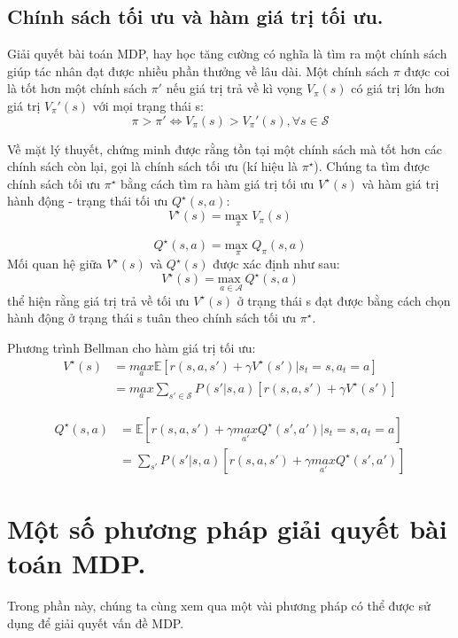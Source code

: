 \documentclass{uetgraduation}
\begin{document}
\subsection{Chính sách tối ưu và hàm giá trị tối ưu.}
Giải quyết bài toán MDP, hay học tăng cường có nghĩa là tìm ra một chính sách giúp tác nhân đạt được nhiều phần thưởng về lâu dài. Một chính sách $\pi$ được coi là tốt hơn một chính sách $\pi'$ nếu giá
trị trả về kì vọng $V_\pi(s)$ có giá trị lớn hơn giá trị $V_\pi'(s)$ với mọi trạng thái s:
\[
\pi > \pi' \iff V_\pi(s) > V_\pi'(s), \forall s \in \mathcal{S}
\]

Về mặt lý thuyết, chứng minh được rằng tồn tại một chính sách mà tốt hơn các chính sách còn lại, gọi là chính sách tối ưu (kí hiệu là $\pi^\star$). Chúng ta tìm được chính sách tối ưu $\pi^\star$ bằng
cách tìm ra hàm giá trị tối ưu $V^\star(s)$ và hàm giá trị hành động - trạng thái tối ưu $Q^\star (s, a)$:
\[
V^\star (s) = \underset{\pi}{\text{max }} V_\pi(s)
\]

\[
Q^\star (s, a) = \underset{\pi}{\text{max }} Q_\pi(s, a)
\]
Mối quan hệ giữa $V^\star (s)$ và $Q^\star (s)$ được xác định như sau:
\[
V^\star (s) = \underset{a \in \mathcal{A}}{\text{max }} Q^\star (s, a)
\]
thể hiện rằng giá trị trả về tối ưu $V^\star (s)$ ở trạng thái s đạt được bằng cách chọn hành động ở trạng thái s tuân theo chính sách tối ưu $\pi^\star$.

Phương trình Bellman cho hàm giá trị tối ưu:
\begin{align*}
    V^\star (s) &= \underset{a}{max } \mathbb{E} [r(s, a, s') + \gamma V^\star (s') | s_t = s, a_t = a] \\
    &= \underset{a}{max } \sum_{s' \in \mathcal{S}} P(s' | s, a) [r(s, a, s') + \gamma V^\star (s')]
\end{align*}

\begin{align*}
    Q^\star (s, a) &= \mathbb{E} [r(s, a, s') + \gamma \underset{a'}{ max } Q^\star (s', a') | s_t = s, a_t = a] \\
    &= \sum_{s'} P(s' | s, a) [r(s, a, s') + \gamma \underset{a'}{max } Q^\star (s', a')]
\end{align*}

\section{Một số phương pháp giải quyết bài toán MDP.}
Trong phần này, chúng ta cùng xem qua một vài phương pháp có thể được sử dụng để giải quyết vấn đề MDP.
\end{document}
